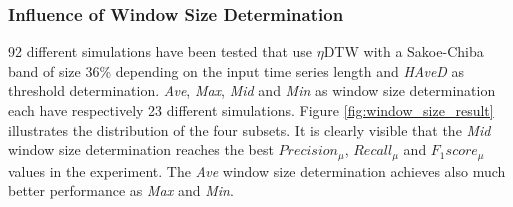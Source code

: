 \subsubsection{Influence of Window Size Determination} \label{influence_of_window_size_determination}
92 different simulations have been tested that use $\eta$DTW with a Sakoe-Chiba band of size 36\% depending on the
input time series length and \textit{HAveD} as threshold determination. \textit{Ave}, \textit{Max}, \textit{Mid} and
\textit{Min} as window size determination each have respectively 23 different simulations. Figure
\ref{fig:window_size_result} illustrates the distribution of the four subsets. It is clearly visible that the
\textit{Mid} window size determination reaches the best $Precision_{\mu}$, $Recall_{\mu}$ and $F_{1}score_{\mu}$
values in the experiment. The \textit{Ave} window size determination achieves also much better performance as
\textit{Max} and \textit{Min}.

